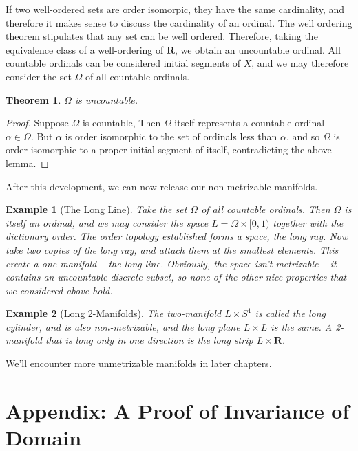\documentclass[12pt]{report}
\theoremstyle{plain}
\newtheorem{theorem}{Theorem}[chapter]
\newtheorem*{example}{Example}
\theoremstyle{definition}
\begin{document}
If two well-ordered sets are order isomorpic, they have the same cardinality, and therefore it makes sense to discuss the cardinality of an ordinal. The well ordering theorem stipulates that any set can be well ordered. Therefore, taking the equivalence class of a well-ordering of $\mathbf{R}$, we obtain an uncountable ordinal. All countable ordinals can be considered initial segments of $X$, and we may therefore consider the set $\Omega$ of all countable ordinals.

\begin{theorem}
    $\Omega$ is uncountable.
\end{theorem}
\begin{proof}
    Suppose $\Omega$ is countable, Then $\Omega$ itself represents a countable ordinal $\alpha \in \Omega$. But $\alpha$ is order isomorphic to the set of ordinals less than $\alpha$, and so $\Omega$ is order isomorphic to a proper initial segment of itself, contradicting the above lemma.
\end{proof}

After this development, we can now release our non-metrizable manifolds.

\begin{example}[The Long Line]
    Take the set $\Omega$ of all countable ordinals. Then $\Omega$ is itself an ordinal, and we may consider the space $L = \Omega \times [0,1)$ together with the dictionary order. The order topology established forms a space, the long ray. Now take two copies of the long ray, and attach them at the smallest elements. This create a one-manifold -- the long line. Obviously, the space isn't metrizable -- it contains an uncountable discrete subset, so none of the other nice properties that we considered above hold.
\end{example}

\begin{example}[Long 2-Manifolds]
    The two-manifold $L \times S^1$ is called the long cylinder, and is also non-metrizable, and the long plane $L \times L$ is the same. A 2-manifold that is long only in one direction is the long strip $L \times \mathbf{R}$.
\end{example}

We'll encounter more unmetrizable manifolds in later chapters.

\newpage

\section{Appendix: A Proof of Invariance of Domain}
\end{document}
